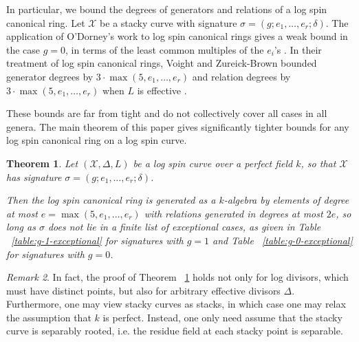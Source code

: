 \documentclass{amsart}
\theoremstyle{plain}
\newtheorem{thm}{Theorem}[section]
\theoremstyle{definition}
\theoremstyle{remark}
\newtheorem{rem}[thm]{Remark}
\numberwithin{equation}{section}
\DeclareMathOperator\di{Div}
\newcommand\sx{\mathscr X}
\newcommand \subhalf[1]{\frac{{#1} - 1}{2{#1}}}
\newcommand{\halfcan}{L}
\begin{document}

In particular, we bound the degrees of generators and relations of a
log spin canonical ring. Let
$\sx$ be a stacky curve with signature $\sigma = (g; e_1, \ldots,
e_r; \delta)$. The application of O'Dorney's work to log spin
canonical rings gives a weak bound in the case $g = 0$, in
terms of the least common multiples of the $e_i$'s \cite[Chapter 5]
{dorney:canonical}. In their treatment of log spin canonical
rings, Voight and Zureick-Brown bounded generator degrees by $3 \cdot \max(5, e_1, \ldots, e_r)$
and relation degrees by $3 \cdot \max(5, e_1, \ldots, e_r)$ when $\halfcan$ is effective
\cite[Corollary 10.4.6]{vzb:stacky}.

These bounds are far from tight and do not collectively
cover all cases in all genera. The main theorem of this paper
gives significantly tighter bounds for any log spin canonical ring on a log spin curve.

\begin{thm}
\label{thm:main}
Let $(\sx, \Delta, \halfcan)$ be a log spin curve over a perfect
field $k$, so that $\sx$ has signature $\sigma = (g; e_1, \ldots,
e_r; \delta)$.

Then the log spin canonical ring is generated as a $k$-algebra by 
elements of degree at most $e = \max(5, e_1, \ldots, e_r)$ with
relations generated in degrees at most $2e$,
so long as $\sigma$ does not lie in a finite list of exceptional
cases, as given in Table ~\ref{table:g-1-exceptional} for
signatures with $g = 1$ and Table ~\ref{table:g-0-exceptional} for
signatures with $g = 0$.
\end{thm}

\begin{rem}
\label{rem:main-weaker-assumptions}
In fact, the proof of Theorem ~\ref{thm:main} holds not only for log divisors, which must have distinct points, but also for arbitrary effective divisors
$\Delta$. Furthermore, one may view stacky curves as stacks, in which case one may relax the assumption that $k$ is perfect. Instead, one only need assume that the stacky curve
is separably rooted, i.e. the residue field at each stacky point
is separable.
\end{rem}
\end{document}
